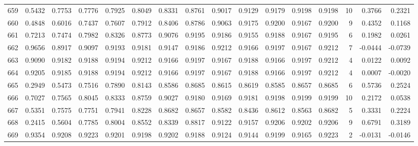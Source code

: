 \begin{tabular}{lrrrrrrrrrrrrrrr}
659 &      0.5432 &  0.7753 &  0.7776 &  0.7925 &  0.8049 &  0.8331 &  0.8761 &  0.9017 &  0.9129 &  0.9179 &   0.9198 &     0.9198 &     10 &                    0.3766 &                     0.2321 \\
660 &      0.4848 &  0.6016 &  0.7437 &  0.7607 &  0.7912 &  0.8406 &  0.8786 &  0.9063 &  0.9175 &  0.9200 &   0.9167 &     0.9200 &      9 &                    0.4352 &                     0.1168 \\
661 &      0.7213 &  0.7474 &  0.7982 &  0.8326 &  0.8773 &  0.9076 &  0.9195 &  0.9186 &  0.9155 &  0.9188 &   0.9167 &     0.9195 &      6 &                    0.1982 &                     0.0261 \\
662 &      0.9656 &  0.8917 &  0.9097 &  0.9193 &  0.9181 &  0.9147 &  0.9186 &  0.9212 &  0.9166 &  0.9197 &   0.9167 &     0.9212 &      7 &                   -0.0444 &                    -0.0739 \\
663 &      0.9090 &  0.9182 &  0.9188 &  0.9194 &  0.9212 &  0.9166 &  0.9197 &  0.9167 &  0.9188 &  0.9166 &   0.9197 &     0.9212 &      4 &                    0.0122 &                     0.0092 \\
664 &      0.9205 &  0.9185 &  0.9188 &  0.9194 &  0.9212 &  0.9166 &  0.9197 &  0.9167 &  0.9188 &  0.9166 &   0.9197 &     0.9212 &      4 &                    0.0007 &                    -0.0020 \\
665 &      0.2949 &  0.5473 &  0.7516 &  0.7890 &  0.8143 &  0.8586 &  0.8685 &  0.8615 &  0.8619 &  0.8585 &   0.8657 &     0.8685 &      6 &                    0.5736 &                     0.2524 \\
666 &      0.7027 &  0.7565 &  0.8045 &  0.8333 &  0.8759 &  0.9027 &  0.9180 &  0.9169 &  0.9181 &  0.9198 &   0.9199 &     0.9199 &     10 &                    0.2172 &                     0.0538 \\
667 &      0.5351 &  0.7575 &  0.7751 &  0.7941 &  0.8228 &  0.8682 &  0.8657 &  0.8582 &  0.8436 &  0.8612 &   0.8563 &     0.8682 &      5 &                    0.3331 &                     0.2224 \\
668 &      0.2415 &  0.5604 &  0.7785 &  0.8004 &  0.8552 &  0.8339 &  0.8817 &  0.9122 &  0.9157 &  0.9206 &   0.9202 &     0.9206 &      9 &                    0.6791 &                     0.3189 \\
669 &      0.9354 &  0.9208 &  0.9223 &  0.9201 &  0.9198 &  0.9202 &  0.9188 &  0.9124 &  0.9144 &  0.9199 &   0.9165 &     0.9223 &      2 &                   -0.0131 &                    -0.0146 \\

\end{tabular}
